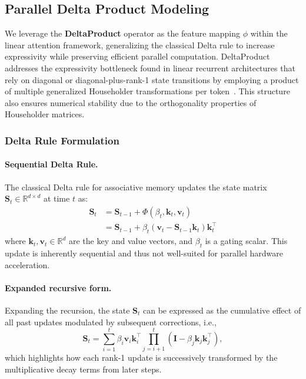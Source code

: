 \documentclass[10pt,a4paper]{article}
\begin{document}
\subsection{Parallel Delta Product Modeling}

We leverage the \textbf{DeltaProduct} operator as the feature mapping $\phi$ within the linear attention framework, generalizing the classical Delta rule to increase expressivity while preserving efficient parallel computation. DeltaProduct addresses the expressivity bottleneck found in linear recurrent architectures that rely on diagonal or diagonal-plus-rank-1 state transitions by employing a product of multiple generalized Householder transformations per token~\cite{siems2025deltaproduct}. This structure also ensures numerical stability due to the orthogonality properties of Householder matrices.

\subsubsection{Delta Rule Formulation}


\paragraph{Sequential Delta Rule.}

The classical Delta rule for associative memory updates the state matrix $\mathbf{S}_t \in \mathbb{R}^{d \times d}$ at time $t$ as:
\begin{align}
    \mathbf{S}_t &= \mathbf{S}_{t-1} + \Phi(\beta_t, \mathbf{k}_t,\mathbf{v}_t)  \\
    &= \mathbf{S}_{t-1} + \beta_t \left( \mathbf{v}_t - \mathbf{S}_{t-1} \mathbf{k}_t \right) \mathbf{k}_t^\top
    \label{eq:deltarule}
\end{align}
where $\mathbf{k}_t, \mathbf{v}_t \in \mathbb{R}^d$ are the key and value vectors, and $\beta_t$ is a gating scalar. This update is inherently sequential and thus not well-suited for parallel hardware acceleration.

\paragraph{Expanded recursive form.}

Expanding the recursion, the state $\mathbf{S}_t$ can be expressed as the cumulative effect of all past updates modulated by subsequent corrections, i.e.,
\begin{equation}
    \mathbf{S}_t = \sum_{i=1}^t \beta_i \mathbf{v}_i \mathbf{k}_i^\top \prod_{j=i+1}^t \left( \mathbf{I} - \beta_j \mathbf{k}_j \mathbf{k}_j^\top \right),
\end{equation}
which highlights how each rank-1 update is successively transformed by the multiplicative decay terms from later steps.
\end{document}

